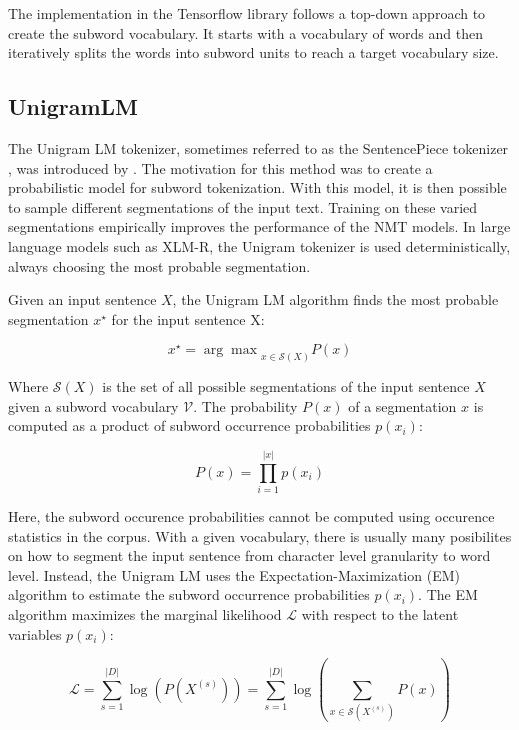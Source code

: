 The implementation in the Tensorflow library follows a top-down approach to create the subword vocabulary. It starts with a vocabulary of words and then iteratively splits the words into subword units to reach a target vocabulary size.

\subsection{UnigramLM}

The Unigram LM tokenizer, sometimes referred to as the SentencePiece tokenizer \citep{KudoandRichardson2018}, was introduced by \citet{Kudo2018}. The motivation for this method was to create a probabilistic model for subword tokenization. With this model, it is then possible to sample different segmentations of the input text. Training on these varied segmentations empirically improves the performance of the NMT models. In large language models such as XLM-R, the Unigram tokenizer is used deterministically, always choosing the most probable segmentation.

Given an input sentence $X$, the Unigram LM algorithm finds the most probable segmentation $x^\star$ for the input sentence X:

\begin{equation}
    x^\star = {\arg\max}_{x \in \mathcal{S}(X)} P(x)
\end{equation}


Where $\mathcal{S}(X)$ is the set of all possible segmentations of the input sentence $X$ given a subword vocabulary $\mathcal{V}$. The probability $P(x)$ of a segmentation $x$ is computed as a product of subword occurrence probabilities $p(x_i)$:

\begin{equation}
    P(x) = \prod_{i=1}^{|x|} p(x_i)
\end{equation}

Here, the subword occurence probabilities cannot be computed using occurence statistics in the corpus. With a given vocabulary, there is usually many posibilites on how to segment the input sentence from character level granularity to word level. Instead, the Unigram LM uses the Expectation-Maximization (EM) algorithm to estimate the subword occurrence probabilities $p(x_i)$. The EM algorithm maximizes the marginal likelihood $\mathcal{L}$ with respect to the latent variables $p(x_i)$:

\begin{equation}
    \mathcal{L} = \sum_{s=1}^{|D|} \log (P(X^{(s)})) = \sum_{s=1}^{|D|} \log( \sum_{x \in \mathcal{S}(X^{(s)})} P(x) )
\end{equation}


